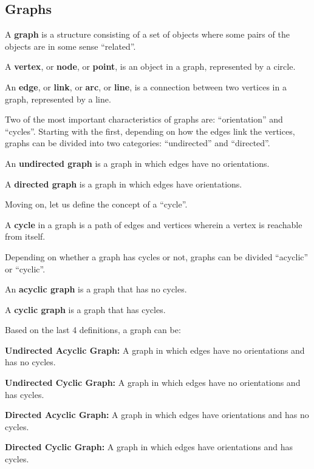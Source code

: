 
\subsection{Graphs}

\bd[Graph]
A \textbf{graph} is a structure consisting of a set of objects where some pairs of the objects are in some sense
``related''.
\ed

A \textbf{vertex}, or \textbf{node}, or \textbf{point}, is an object in a graph, represented by a circle.
\ed

An \textbf{edge}, or \textbf{link}, or \textbf{arc}, or \textbf{line}, is a connection between two vertices in a graph,
represented by a line.
\ed

Two of the most important characteristics of graphs are: ``orientation'' and ``cycles''. Starting with the first,
depending on how the edges link the vertices, graphs can be divided into two categories: ``undirected'' and
``directed''.

An \textbf{undirected graph} is a graph in which edges have no orientations.
\ed


A \textbf{directed graph} is a graph in which edges have orientations.
\ed


Moving on, let us define the concept of a ``cycle''.

\bd[Cycle]
A \textbf{cycle} in a graph is a path of edges and vertices wherein a vertex is reachable from itself.
\ed

Depending on whether a graph has cycles or not, graphs can be divided ``acyclic'' or ``cyclic''.

An \textbf{acyclic graph} is a graph that has no cycles.
\ed


A \textbf{cyclic graph} is a graph that has cycles.
\ed


Based on the last 4 definitions, a graph can be:
\bit
\item \textbf{Undirected Acyclic Graph:} A graph in which edges have no orientations and has no cycles.
\item \textbf{Undirected Cyclic Graph:} A graph in which edges have no orientations and has cycles.
\item \textbf{Directed Acyclic Graph:} A graph in which edges have orientations and has no cycles.
\item \textbf{Directed Cyclic Graph:} A graph in which edges have orientations and has cycles.
\eit

